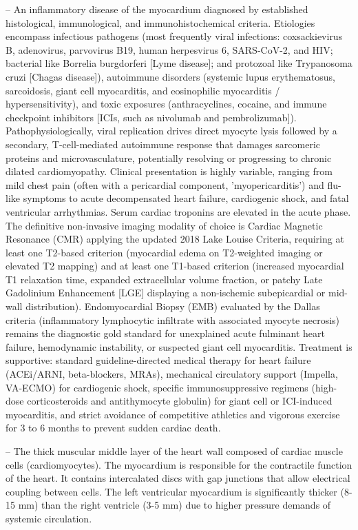 -- An inflammatory disease of the myocardium diagnosed by established histological, immunological, and immunohistochemical criteria. Etiologies encompass infectious pathogens (most frequently viral infections: coxsackievirus B, adenovirus, parvovirus B19, human herpesvirus 6, SARS-CoV-2, and HIV; bacterial like Borrelia burgdorferi [Lyme disease]; and protozoal like Trypanosoma cruzi [Chagas disease]), autoimmune disorders (systemic lupus erythematosus, sarcoidosis, giant cell myocarditis, and eosinophilic myocarditis / hypersensitivity), and toxic exposures (anthracyclines, cocaine, and immune checkpoint inhibitors [ICIs, such as nivolumab and pembrolizumab]). Pathophysiologically, viral replication drives direct myocyte lysis followed by a secondary, T-cell-mediated autoimmune response that damages sarcomeric proteins and microvasculature, potentially resolving or progressing to chronic dilated cardiomyopathy. Clinical presentation is highly variable, ranging from mild chest pain (often with a pericardial component, 'myopericarditis') and flu-like symptoms to acute decompensated heart failure, cardiogenic shock, and fatal ventricular arrhythmias. Serum cardiac troponins are elevated in the acute phase. The definitive non-invasive imaging modality of choice is Cardiac Magnetic Resonance (CMR) applying the updated 2018 Lake Louise Criteria, requiring at least one T2-based criterion (myocardial edema on T2-weighted imaging or elevated T2 mapping) and at least one T1-based criterion (increased myocardial T1 relaxation time, expanded extracellular volume fraction, or patchy Late Gadolinium Enhancement [LGE] displaying a non-ischemic subepicardial or mid-wall distribution). Endomyocardial Biopsy (EMB) evaluated by the Dallas criteria (inflammatory lymphocytic infiltrate with associated myocyte necrosis) remains the diagnostic gold standard for unexplained acute fulminant heart failure, hemodynamic instability, or suspected giant cell myocarditis. Treatment is supportive: standard guideline-directed medical therapy for heart failure (ACEi/ARNI, beta-blockers, MRAs), mechanical circulatory support (Impella, VA-ECMO) for cardiogenic shock, specific immunosuppressive regimens (high-dose corticosteroids and antithymocyte globulin) for giant cell or ICI-induced myocarditis, and strict avoidance of competitive athletics and vigorous exercise for 3 to 6 months to prevent sudden cardiac death.

-- The thick muscular middle layer of the heart wall composed of cardiac muscle cells (cardiomyocytes). The myocardium is responsible for the contractile function of the heart. It contains intercalated discs with gap junctions that allow electrical coupling between cells. The left ventricular myocardium is significantly thicker (8-15 mm) than the right ventricle (3-5 mm) due to higher pressure demands of systemic circulation.

